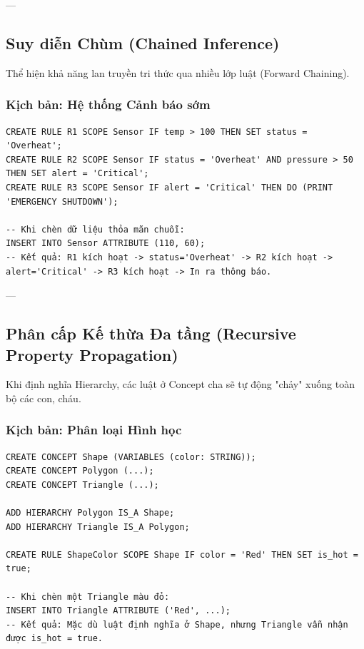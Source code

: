 ---

\subsection{Suy diễn Chùm (Chained Inference)}

Thể hiện khả năng lan truyền tri thức qua nhiều lớp luật (Forward Chaining).

\subsubsection{Kịch bản: Hệ thống Cảnh báo sớm}
\begin{verbatim}
CREATE RULE R1 SCOPE Sensor IF temp > 100 THEN SET status = 'Overheat';
CREATE RULE R2 SCOPE Sensor IF status = 'Overheat' AND pressure > 50 THEN SET alert = 'Critical';
CREATE RULE R3 SCOPE Sensor IF alert = 'Critical' THEN DO (PRINT 'EMERGENCY SHUTDOWN');

-- Khi chèn dữ liệu thỏa mãn chuỗi:
INSERT INTO Sensor ATTRIBUTE (110, 60);
-- Kết quả: R1 kích hoạt -> status='Overheat' -> R2 kích hoạt -> alert='Critical' -> R3 kích hoạt -> In ra thông báo.
\end{verbatim}

---

\subsection{Phân cấp Kế thừa Đa tầng (Recursive Property Propagation)}

Khi định nghĩa Hierarchy, các luật ở Concept cha sẽ tự động "chảy" xuống toàn bộ các con, cháu.

\subsubsection{Kịch bản: Phân loại Hình học}
\begin{verbatim}
CREATE CONCEPT Shape (VARIABLES (color: STRING));
CREATE CONCEPT Polygon (...);
CREATE CONCEPT Triangle (...);

ADD HIERARCHY Polygon IS_A Shape;
ADD HIERARCHY Triangle IS_A Polygon;

CREATE RULE ShapeColor SCOPE Shape IF color = 'Red' THEN SET is_hot = true;

-- Khi chèn một Triangle màu đỏ:
INSERT INTO Triangle ATTRIBUTE ('Red', ...);
-- Kết quả: Mặc dù luật định nghĩa ở Shape, nhưng Triangle vẫn nhận được is_hot = true.
\end{verbatim}

